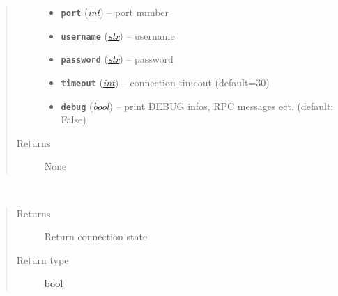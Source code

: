 \documentclass[letterpaper,10pt,english]{sphinxmanual}
\begin{document}
\begin{fulllineitems}
\begin{fulllineitems}
\begin{quote}
\begin{description}
\begin{itemize}
\item {} 
\textbf{\texttt{port}} (\href{https://docs.python.org/2.7/library/functions.html\#int}{\emph{int}}) -- port number

\item {} 
\textbf{\texttt{username}} (\href{https://docs.python.org/2.7/library/functions.html\#str}{\emph{str}}) -- username

\item {} 
\textbf{\texttt{password}} (\href{https://docs.python.org/2.7/library/functions.html\#str}{\emph{str}}) -- password

\item {} 
\textbf{\texttt{timeout}} (\href{https://docs.python.org/2.7/library/functions.html\#int}{\emph{int}}) -- connection timeout (default=30)

\item {} 
\textbf{\texttt{debug}} (\href{https://docs.python.org/2.7/library/functions.html\#bool}{\emph{bool}}) -- print DEBUG infos, RPC messages ect. (default: False)

\end{itemize}

\item[{Returns}] \leavevmode
None

\end{description}\end{quote}

\end{fulllineitems}


\begin{fulllineitems}
\label{util/netconf:escape.util.netconf.AbstractNETCONFAdapter.connected}~\begin{quote}\begin{description}
\item[{Returns}] \leavevmode
Return connection state

\item[{Return type}] \leavevmode
\href{https://docs.python.org/2.7/library/functions.html\#bool}{bool}

\end{description}\end{quote}

\end{fulllineitems}



\end{fulllineitems}
\end{document}

